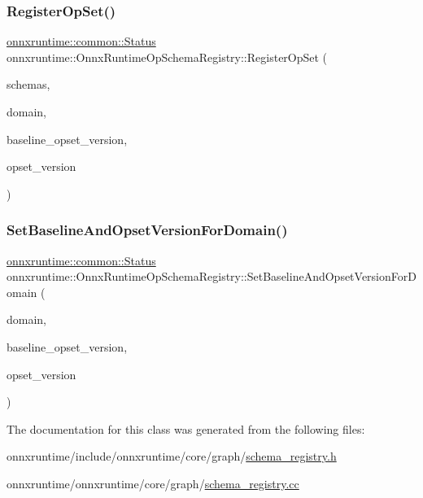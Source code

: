 \subsubsection{\texorpdfstring{Register\+Op\+Set()}{RegisterOpSet()}}
{\footnotesize\ttfamily \mbox{\hyperlink{classonnxruntime_1_1common_1_1Status}{onnxruntime\+::common\+::\+Status}} onnxruntime\+::\+Onnx\+Runtime\+Op\+Schema\+Registry\+::\+Register\+Op\+Set (\begin{DoxyParamCaption}\item[{std\+::vector$<$ O\+N\+N\+X\+\_\+\+N\+A\+M\+E\+S\+P\+A\+C\+E\+::\+Op\+Schema $>$ \&}]{schemas,  }\item[{const std\+::string \&}]{domain,  }\item[{int}]{baseline\+\_\+opset\+\_\+version,  }\item[{int}]{opset\+\_\+version }\end{DoxyParamCaption})}

\mbox{\label{classonnxruntime_1_1OnnxRuntimeOpSchemaRegistry_a5a342a48e87028bfec6a725893f646d1}} 
\subsubsection{\texorpdfstring{Set\+Baseline\+And\+Opset\+Version\+For\+Domain()}{SetBaselineAndOpsetVersionForDomain()}}
{\footnotesize\ttfamily \mbox{\hyperlink{classonnxruntime_1_1common_1_1Status}{onnxruntime\+::common\+::\+Status}} onnxruntime\+::\+Onnx\+Runtime\+Op\+Schema\+Registry\+::\+Set\+Baseline\+And\+Opset\+Version\+For\+Domain (\begin{DoxyParamCaption}\item[{const std\+::string \&}]{domain,  }\item[{int}]{baseline\+\_\+opset\+\_\+version,  }\item[{int}]{opset\+\_\+version }\end{DoxyParamCaption})}



The documentation for this class was generated from the following files\+:\begin{DoxyCompactItemize}
\item 
onnxruntime/include/onnxruntime/core/graph/\mbox{\hyperlink{schema__registry_8h}{schema\+\_\+registry.\+h}}\item 
onnxruntime/onnxruntime/core/graph/\mbox{\hyperlink{schema__registry_8cc}{schema\+\_\+registry.\+cc}}\end{DoxyCompactItemize}
